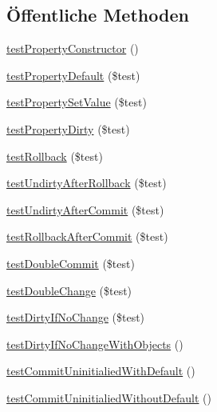 \subsection*{Öffentliche Methoden}
\begin{DoxyCompactItemize}
\item 
\hyperlink{classTests_1_1Unit_1_1PropertyTest_aa96c49473a1e04265e1f1ff4a019050b}{test\+Property\+Constructor} ()
\item 
\hyperlink{classTests_1_1Unit_1_1PropertyTest_a2e14a3b44b103c7af4a18d9a5c9db7a8}{test\+Property\+Default} (\$test)
\item 
\hyperlink{classTests_1_1Unit_1_1PropertyTest_a1515a0e79cad8a9e9d78a41ace6a90f5}{test\+Property\+Set\+Value} (\$test)
\item 
\hyperlink{classTests_1_1Unit_1_1PropertyTest_af02ce1180e6902e1b00a15a22cfc3fb6}{test\+Property\+Dirty} (\$test)
\item 
\hyperlink{classTests_1_1Unit_1_1PropertyTest_adf0275f2346bad9bd3a29b742123d7b2}{test\+Rollback} (\$test)
\item 
\hyperlink{classTests_1_1Unit_1_1PropertyTest_af4e052a564d26df4b6dabdbbd636abba}{test\+Undirty\+After\+Rollback} (\$test)
\item 
\hyperlink{classTests_1_1Unit_1_1PropertyTest_a035c61c8919cbe4279fe435eac24b8e7}{test\+Undirty\+After\+Commit} (\$test)
\item 
\hyperlink{classTests_1_1Unit_1_1PropertyTest_abaf62c987484835ce25b2a6eaf406fc3}{test\+Rollback\+After\+Commit} (\$test)
\item 
\hyperlink{classTests_1_1Unit_1_1PropertyTest_aa3491e55ed49fbd92551775eb594500a}{test\+Double\+Commit} (\$test)
\item 
\hyperlink{classTests_1_1Unit_1_1PropertyTest_aed7633e0cf47fdd721c56e66a3ea437d}{test\+Double\+Change} (\$test)
\item 
\hyperlink{classTests_1_1Unit_1_1PropertyTest_a27fad9dd59e460ee1f6c95c2c3b0372d}{test\+Dirty\+If\+No\+Change} (\$test)
\item 
\hyperlink{classTests_1_1Unit_1_1PropertyTest_a56eb3df37a5027c85aca4a4321c0b5d2}{test\+Dirty\+If\+No\+Change\+With\+Objects} ()
\item 
\hyperlink{classTests_1_1Unit_1_1PropertyTest_a830e701ccf9c9d47e4b652d8b245375c}{test\+Commit\+Uninitialied\+With\+Default} ()
\item 
\hyperlink{classTests_1_1Unit_1_1PropertyTest_af5db0ed3d5dfed9d72b9fc1cc18804d7}{test\+Commit\+Uninitialied\+Without\+Default} ()
\item 

\end{DoxyCompactItemize}
